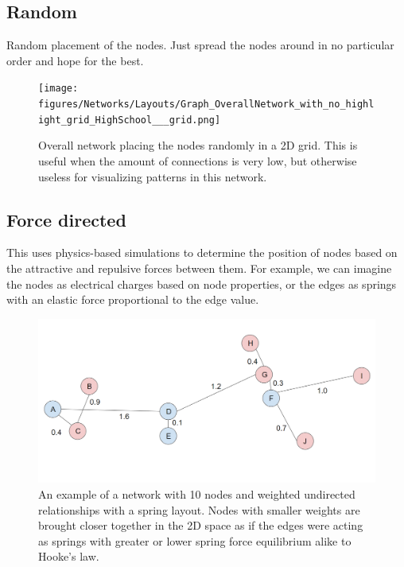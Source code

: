 \clearpage

\subsection{Random}

Random placement of the nodes. Just spread the nodes around in no particular order and hope for the best.

    \begin{figure}[h]
        \centering
            \texttt{[image: figures/Networks/Layouts/Graph\_OverallNetwork\_with\_no\_highlight\_grid\_HighSchool\_\_\_grid.png]} 
        \caption{Overall network placing the nodes randomly in a 2D grid. This is useful when the amount of connections is very low, but otherwise useless for visualizing patterns in this network.}
        \label{figure:networksLayoutsGRID}
    \end{figure}

\subsection{Force directed}

This uses physics-based simulations to determine the position of nodes based on the attractive and repulsive forces between them. For example, we can imagine the nodes as electrical charges based on node properties, or the edges as springs with an elastic force proportional to the edge value.

\clearpage

    \begin{figure}[h]
        \centering
            \includegraphics[width=0.7\linewidth]{figures/Networks/Concepts/edgesSpring.png} 
        \caption{An example of a network with 10 nodes and weighted undirected relationships with a spring layout. Nodes with smaller weights are brought closer together in the 2D space as if the edges were acting as springs with greater or lower spring force equilibrium alike to Hooke’s law.}
        \label{figure:networkExampleSpring}
    \end{figure}

